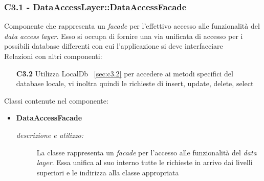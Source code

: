 \subsubsection{C3.1 - DataAccessLayer::DataAccessFacade} \label{sec:c3.1}
Componente che rappresenta un \textit{facade} per l'effettivo accesso alle funzionalità del \textit{data access layer}. Esso si occupa di fornire una via unificata di accesso per i possibili database differenti con cui l'applicazione si deve interfacciare\\
Relazioni con altri componenti: 
\begin{itemize} 
\item [\textbf{C3.2}]
Utilizza LocalDb ~\ref{sec:c3.2} per accedere ai metodi specifici del database locale, vi inoltra quindi le richieste di insert, update, delete, select 
\end{itemize} 

Classi contenute nel componente: 
\begin{itemize} 
\item \textbf{DataAccessFacade}
\begin{description}
\item [\textit{descrizione e utilizzo:}] La classe rappresenta un \textit{facade} per l'accesso alle funzionalità del \textit{data layer}. Essa unifica al suo interno tutte le richieste in arrivo dai livelli superiori e le indirizza alla classe appropriata
\end{description}
\end{itemize}

